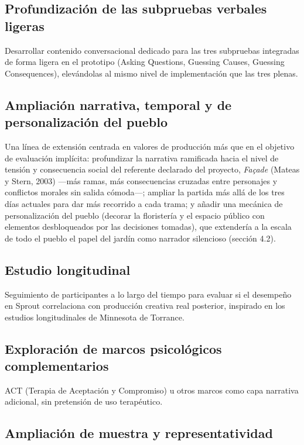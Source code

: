 \documentclass[12pt,twoside,titlepage]{report}
\begin{document}
\subsection{Profundización de las subpruebas verbales ligeras}

Desarrollar contenido conversacional dedicado para las tres subpruebas integradas de forma ligera en el prototipo (Asking Questions, Guessing Causes, Guessing Consequences), elevándolas al mismo nivel de implementación que las tres plenas.

\subsection{Ampliación narrativa, temporal y de personalización del pueblo}

Una línea de extensión centrada en valores de producción más que en el objetivo de evaluación implícita: profundizar la narrativa ramificada hacia el nivel de tensión y consecuencia social del referente declarado del proyecto, \textit{Façade} (Mateas y Stern, 2003) ---más ramas, más consecuencias cruzadas entre personajes y conflictos morales sin salida cómoda---; ampliar la partida más allá de los tres días actuales para dar más recorrido a cada trama; y añadir una mecánica de personalización del pueblo (decorar la floristería y el espacio público con elementos desbloqueados por las decisiones tomadas), que extendería a la escala de todo el pueblo el papel del jardín como narrador silencioso (sección 4.2).

\subsection{Estudio longitudinal}

Seguimiento de participantes a lo largo del tiempo para evaluar si el desempeño en Sprout correlaciona con producción creativa real posterior, inspirado en los estudios longitudinales de Minnesota de Torrance.

\subsection{Exploración de marcos psicológicos complementarios}

ACT (Terapia de Aceptación y Compromiso) u otros marcos como capa narrativa adicional, sin pretensión de uso terapéutico.

\subsection{Ampliación de muestra y representatividad}
\end{document}
